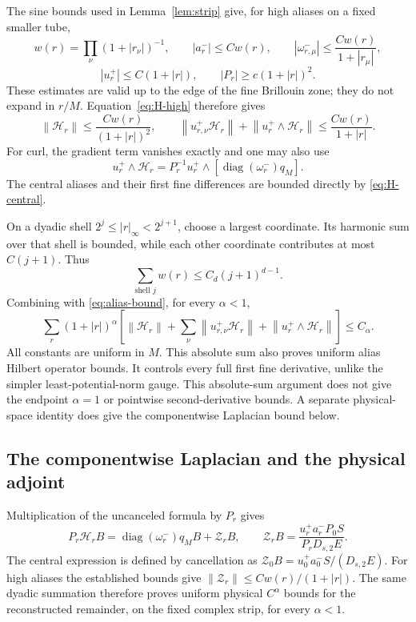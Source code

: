 \documentclass[11pt]{article}
\theoremstyle{remark}
\newcommand{\norm}[1]{\left\|#1\right\|}
\newcommand{\diag}{\operatorname{diag}}
\newcommand{\HH}{\mathcal H}
\begin{document}
The sine bounds used in Lemma~\ref{lem:strip} give, for high aliases
on a fixed smaller tube,
\[
 w(r)=\prod_\nu(1+|r_\nu|)^{-1},\qquad
 |a_r^-|\le Cw(r),\qquad
 |\omega_{r,\mu}^-|\le\frac{Cw(r)}{1+|r_\mu|},
\]
\[
 |u_r^+|\le C(1+|r|),\qquad |P_r|\ge c(1+|r|)^2.
\]
These estimates are valid up to the edge of the fine Brillouin
zone; they do not expand in $r/M$. Equation~\eqref{eq:H-high}
therefore gives
\begin{equation}\label{eq:alias-bound}
 \norm{\HH_r}\le\frac{Cw(r)}{(1+|r|)^2},\qquad
 \norm{u_{r,\nu}^+\HH_r}
       +\norm{u_r^+\wedge\HH_r}
       \le\frac{Cw(r)}{1+|r|}.
\end{equation}
For curl, the gradient term vanishes exactly and one may also use
\[
 u_r^+\wedge\HH_r
       =P_r^{-1}u_r^+\wedge[\diag(\omega_r^-)q_M].
\]
The central aliases and their first fine differences are bounded
directly by \eqref{eq:H-central}.

On a dyadic shell $2^j\le|r|_\infty<2^{j+1}$, choose a largest
coordinate. Its harmonic sum over that shell is bounded, while
each other coordinate contributes at most $C(j+1)$. Thus
\[
 \sum_{\text{shell }j}w(r)\le C_d(j+1)^{d-1}.
\]
Combining with \eqref{eq:alias-bound}, for every $\alpha<1$,
\begin{equation}\label{eq:weighted-alias}
 \sum_r(1+|r|)^\alpha
 \left[\norm{\HH_r}+
       \sum_\nu\norm{u_{r,\nu}^+\HH_r}
       +\norm{u_r^+\wedge\HH_r}\right]\le C_\alpha.
\end{equation}
All constants are uniform in $M$. This absolute sum also proves
uniform alias Hilbert operator bounds. It controls every full first
fine derivative, unlike the simpler least-potential-norm gauge.
This absolute-sum argument does not give the endpoint $\alpha=1$
or pointwise second-derivative bounds. A separate physical-space
identity does give the componentwise Laplacian bound below.

\subsection{The componentwise Laplacian and the physical adjoint}

Multiplication of the uncanceled formula by $P_r$ gives
\begin{equation}\label{eq:laplacian-split}
 P_r\HH_rB=\diag(\omega_r^-)q_MB+\mathcal Z_rB,
 \qquad
 \mathcal Z_rB=\frac{u_r^+a_r^-P_0S}{P_rD_{s,2}E}.
\end{equation}
The central expression is defined by cancellation as
$\mathcal Z_0B=u_0^+a_0^-S/(D_{s,2}E)$.
For high aliases the established bounds give
$\norm{\mathcal Z_r}\le Cw(r)/(1+|r|)$.
The same dyadic summation therefore proves uniform physical
$C^\alpha$ bounds for the reconstructed remainder, on the fixed
complex strip, for every $\alpha<1$.
\end{document}
